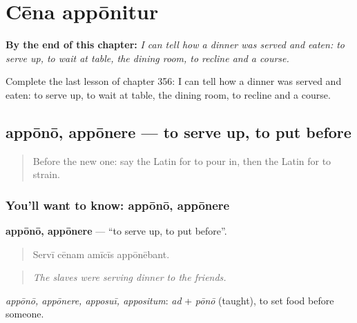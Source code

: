 
\chapter{Cēna appōnitur}
\label{ch:la-cena-apponitur}

\begin{chapteropening}
\textbf{By the end of this chapter:} \emph{I can tell how a dinner was served and eaten: to serve up, to wait at table, the dining room, to recline and a course.}

Complete the last lesson of chapter 356: I can tell how a dinner was served and eaten: to serve up, to wait at table, the dining room, to recline and a course.
\end{chapteropening}

\section[appōnō, appōnere]{appōnō, appōnere — to serve up, to put before}

\label{lesson:LA-C356-appono}



\begin{quote}
Before the new one: say the Latin for to pour in, then the Latin for to strain.
\end{quote}

\subsection*{You'll want to know: appōnō, appōnere}
\textbf{appōnō, appōnere} — \textquotedblleft{}to serve up, to put before\textquotedblright{}.

\begin{quote}
Servī cēnam amīcīs appōnēbant.
\end{quote}

\begin{quote}
\emph{The slaves were serving dinner to the friends.}
\end{quote}

\emph{appōnō, appōnere, apposuī, appositum}: \emph{ad} + \emph{pōnō} (taught), to set food before someone.

